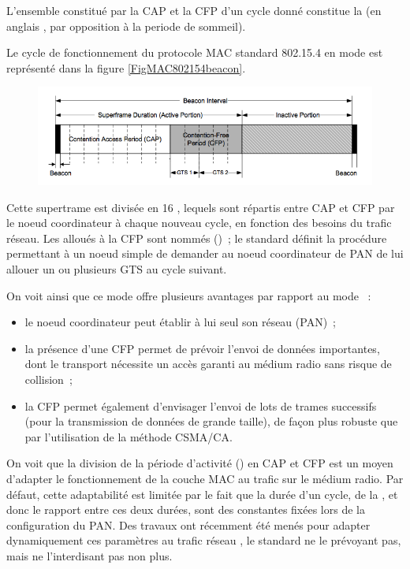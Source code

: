 L'ensemble constitué par la CAP et la CFP d'un cycle donné constitue
la  (en anglais , par opposition
à la periode de sommeil).

Le cycle de fonctionnement du protocole MAC standard 802.15.4 en mode
 est représenté dans la figure
\vref{FigMAC802154beacon}.

\begin{figure}[!hbt]
\centering
\includegraphics[width=12.5cm]{images/ch3-ieee802154-mode-beacon.png}
\label{FigMAC802154beacon}
\end{figure}

Cette supertrame est divisée en 16 , lequels sont
répartis entre CAP et CFP par le noeud coordinateur à chaque nouveau cycle,
en fonction des besoins du trafic réseau. Les  alloués
à la CFP sont nommés  ()~; le standard
définit la procédure permettant à un noeud simple de demander au noeud
coordinateur de PAN de lui allouer un ou plusieurs GTS au cycle suivant.

On voit ainsi que ce mode offre plusieurs avantages par rapport au mode
~:
\begin{itemize}
\item le noeud coordinateur peut établir à lui seul son réseau (PAN)~;
\item la présence d'une CFP permet de prévoir l'envoi de données
importantes, dont le transport nécessite un accès garanti au médium
radio sans risque de collision~;
\item la CFP permet également d'envisager l'envoi de lots de trames
successifs (pour la transmission de données de grande taille), de façon
plus robuste que par l'utilisation de la méthode CSMA/CA.
\end{itemize}

On voit que la division de la période d'activité () en CAP
et CFP est un moyen d'adapter le fonctionnement de la couche MAC au trafic
sur le médium radio. Par défaut, cette adaptabilité est limitée par le fait
que la durée d'un cycle, de la , et donc le rapport entre
ces deux durées, sont des constantes fixées lors de la configuration du PAN.
Des travaux ont récemment été menés pour adapter dynamiquement ces
paramètres au trafic réseau \cite{TheseSKhssibi}, le standard ne le
prévoyant pas, mais ne l'interdisant pas non plus.

